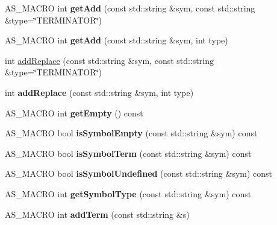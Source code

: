 \begin{DoxyCompactItemize}
A\+S\+\_\+\+M\+A\+C\+RO int {\bfseries get\+Add} (const std\+::string \&sym, const std\+::string \&type=\char`\"{}T\+E\+R\+M\+I\+N\+A\+T\+OR\char`\"{})
\item 
\mbox{\label{classx2_1_1_gramma_symbols_aefe73ad5dbbda477272ccadfcc2ef84a}} 
A\+S\+\_\+\+M\+A\+C\+RO int {\bfseries get\+Add} (const std\+::string \&sym, int type)
\item 
int \hyperlink{classx2_1_1_gramma_symbols_ac7cb85affa4c6c9a6176ace01d6ed4b6}{add\+Replace} (const std\+::string \&sym, const std\+::string \&type=\char`\"{}T\+E\+R\+M\+I\+N\+A\+T\+OR\char`\"{})
\item 
\mbox{\label{classx2_1_1_gramma_symbols_af183c98f51b9ea1982cf39314790e04f}} 
int {\bfseries add\+Replace} (const std\+::string \&sym, int type)
\item 
\mbox{\label{classx2_1_1_gramma_symbols_ac6966547daf0c9009e27f5ceb1923c2c}} 
A\+S\+\_\+\+M\+A\+C\+RO int {\bfseries get\+Empty} () const
\item 
\mbox{\label{classx2_1_1_gramma_symbols_a23a09b16e7f63902ccd97cc94baabd97}} 
A\+S\+\_\+\+M\+A\+C\+RO bool {\bfseries is\+Symbol\+Empty} (const std\+::string \&sym) const
\item 
\mbox{\label{classx2_1_1_gramma_symbols_a2c8b9e2d1df211b086e2fd678378165e}} 
A\+S\+\_\+\+M\+A\+C\+RO bool {\bfseries is\+Symbol\+Term} (const std\+::string \&sym) const
\item 
\mbox{\label{classx2_1_1_gramma_symbols_a3e74a49ffb1765129d17863820ce743d}} 
A\+S\+\_\+\+M\+A\+C\+RO bool {\bfseries is\+Symbol\+Undefined} (const std\+::string \&sym) const
\item 
\mbox{\label{classx2_1_1_gramma_symbols_a386ddcce4fecf5e158e6371e05c74bba}} 
A\+S\+\_\+\+M\+A\+C\+RO int {\bfseries get\+Symbol\+Type} (const std\+::string \&sym) const
\item 
\mbox{\label{classx2_1_1_gramma_symbols_ae68863cdea90c8ae218fa65498a748d3}} 
A\+S\+\_\+\+M\+A\+C\+RO int {\bfseries add\+Term} (const std\+::string \&s)

\end{DoxyCompactItemize}
